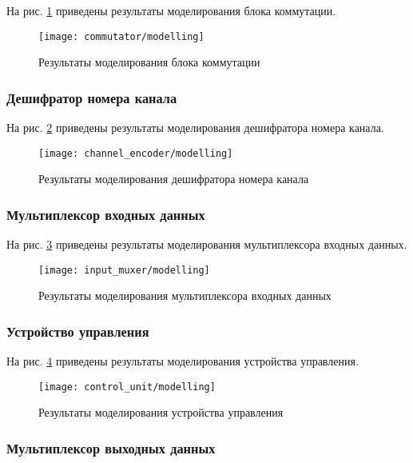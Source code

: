 На рис. \ref{fig:commutator_modelling} приведены результаты моделирования блока коммутации.
\begin{figure}[H]
	\centering
	\texttt{[image: commutator/modelling]}
	\caption{Результаты моделирования блока коммутации}
	\label{fig:commutator_modelling}
\end{figure}

\subsubsection{Дешифратор номера канала}

На рис. \ref{fig:channel_encoder_modelling} приведены результаты моделирования дешифратора номера канала.
\begin{figure}[H]
	\centering
	\texttt{[image: channel\_encoder/modelling]}
	\caption{Результаты моделирования дешифратора номера канала}
	\label{fig:channel_encoder_modelling}
\end{figure}

\subsubsection{Мультиплексор входных данных}

На рис. \ref{fig:input_muxer_modelling} приведены результаты моделирования мультиплексора входных данных.
\begin{figure}[H]
	\centering
	\texttt{[image: input\_muxer/modelling]}
	\caption{Результаты моделирования мультиплексора входных данных}
	\label{fig:input_muxer_modelling}
\end{figure}

\subsubsection{Устройство управления}

На рис. \ref{fig:control_unit_modelling} приведены результаты моделирования устройства управления.
\begin{figure}[H]
	\centering
	\texttt{[image: control\_unit/modelling]}
	\caption{Результаты моделирования устройства управления}
	\label{fig:control_unit_modelling}
\end{figure}

\subsubsection{Мультиплексор выходных данных}


